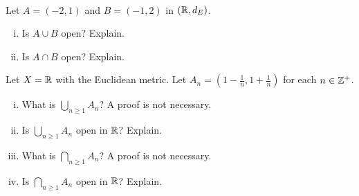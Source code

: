 \begin{activity} \label{act:Open_union} ~
\ba
\item Let $A = (-2,1)$ and $B = (-1,2)$ in $(\mathbb{R}, d_E)$. 
	\begin{enumerate}[i.]
	\item Is $A \cup B$ open? Explain.
		
	\item Is $A \cap B$ open? Explain.
		
	\end{enumerate}
	
\item Let $X = \mathbb{R}$ with the Euclidean metric. Let $A_n = \left(1-\frac{1}{n}, 1+\frac{1}{n}\right)$ for each $n \in \mathbb{Z}^+$.
	\begin{enumerate}[i.]
	\item What is $\bigcup_{n \geq 1} A_n$? A proof is not necessary.
			
	\item Is $\bigcup_{n \geq 1} A_n$ open in $\mathbb{R}$? Explain.
	
	\item What is $\bigcap_{n \geq 1} A_n$? A proof is not necessary.
			
	\item Is $\bigcap_{n \geq 1} A_n$ open in $\mathbb{R}$? Explain.
		
	\end{enumerate}

\ea

\end{activity}

